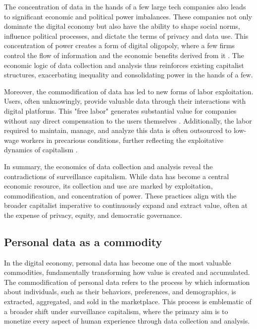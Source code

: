 The concentration of data in the hands of a few large tech companies also leads to significant economic and political power imbalances. These companies not only dominate the digital economy but also have the ability to shape social norms, influence political processes, and dictate the terms of privacy and data use. This concentration of power creates a form of digital oligopoly, where a few firms control the flow of information and the economic benefits derived from it \cite[pp.~72-75]{morozov2013to}. The economic logic of data collection and analysis thus reinforces existing capitalist structures, exacerbating inequality and consolidating power in the hands of a few.

Moreover, the commodification of data has led to new forms of labor exploitation. Users, often unknowingly, provide valuable data through their interactions with digital platforms. This "free labor" generates substantial value for companies without any direct compensation to the users themselves \cite[pp.~21-23]{fuchs2014digital}. Additionally, the labor required to maintain, manage, and analyze this data is often outsourced to low-wage workers in precarious conditions, further reflecting the exploitative dynamics of capitalism \cite[pp.~189-191]{scholz2016uberworked}.

In summary, the economics of data collection and analysis reveal the contradictions of surveillance capitalism. While data has become a central economic resource, its collection and use are marked by exploitation, commodification, and concentration of power. These practices align with the broader capitalist imperative to continuously expand and extract value, often at the expense of privacy, equity, and democratic governance.

\subsection{Personal data as a commodity}

In the digital economy, personal data has become one of the most valuable commodities, fundamentally transforming how value is created and accumulated. The commodification of personal data refers to the process by which information about individuals, such as their behaviors, preferences, and demographics, is extracted, aggregated, and sold in the marketplace. This process is emblematic of a broader shift under surveillance capitalism, where the primary aim is to monetize every aspect of human experience through data collection and analysis.

